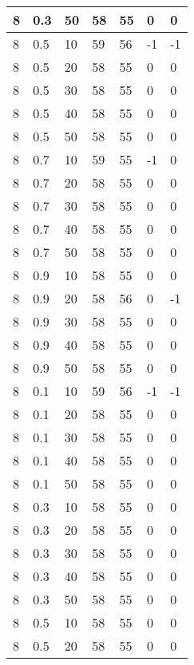 \begin{longtable}{|l|l|l|l|l|l|l|}
		8     & 0.3 & 50   & 58 & 55 & 0   & 0   \\ \hline
		8     & 0.5 & 10   & 59 & 56 & -1  & -1  \\ \hline
		8     & 0.5 & 20   & 58 & 55 & 0   & 0   \\ \hline
		8     & 0.5 & 30   & 58 & 55 & 0   & 0   \\ \hline
		8     & 0.5 & 40   & 58 & 55 & 0   & 0   \\ \hline
		8     & 0.5 & 50   & 58 & 55 & 0   & 0   \\ \hline
		8     & 0.7 & 10   & 59 & 55 & -1  & 0   \\ \hline
		8     & 0.7 & 20   & 58 & 55 & 0   & 0   \\ \hline
		8     & 0.7 & 30   & 58 & 55 & 0   & 0   \\ \hline
		8     & 0.7 & 40   & 58 & 55 & 0   & 0   \\ \hline
		8     & 0.7 & 50   & 58 & 55 & 0   & 0   \\ \hline
		8     & 0.9 & 10   & 58 & 55 & 0   & 0   \\ \hline
		8     & 0.9 & 20   & 58 & 56 & 0   & -1  \\ \hline
		8     & 0.9 & 30   & 58 & 55 & 0   & 0   \\ \hline
		8     & 0.9 & 40   & 58 & 55 & 0   & 0   \\ \hline
		8     & 0.9 & 50   & 58 & 55 & 0   & 0   \\ \hline
		8     & 0.1 & 10   & 59 & 56 & -1  & -1  \\ \hline
		8     & 0.1 & 20   & 58 & 55 & 0   & 0   \\ \hline
		8     & 0.1 & 30   & 58 & 55 & 0   & 0   \\ \hline
		8     & 0.1 & 40   & 58 & 55 & 0   & 0   \\ \hline
		8     & 0.1 & 50   & 58 & 55 & 0   & 0   \\ \hline
		8     & 0.3 & 10   & 58 & 55 & 0   & 0   \\ \hline
		8     & 0.3 & 20   & 58 & 55 & 0   & 0   \\ \hline
		8     & 0.3 & 30   & 58 & 55 & 0   & 0   \\ \hline
		8     & 0.3 & 40   & 58 & 55 & 0   & 0   \\ \hline
		8     & 0.3 & 50   & 58 & 55 & 0   & 0   \\ \hline
		8     & 0.5 & 10   & 58 & 55 & 0   & 0   \\ \hline
		8     & 0.5 & 20   & 58 & 55 & 0   & 0   \\ \hline

\end{longtable}
